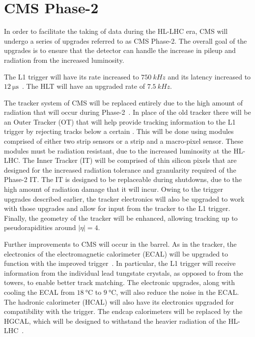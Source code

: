\section{CMS Phase-2}
\label{section:phase2}
In order to facilitate the taking of data during the HL-LHC era, CMS will undergo a series of upgrades referred to as CMS Phase-2. The overall goal of the upgrades is to ensure that the detector can handle the increase in pileup and radiation from the increased luminosity.

The L1 trigger will have its rate increased to $\SI{750}{kHz}$ and its latency increased to $\SI{12}{\us}$~\cite{CERN-LHCC-2020-004}. The HLT will have an upgraded rate of $\SI{7.5}{kHz}$.

The tracker system of CMS will be replaced entirely due to the high amount of radiation that will occur during Phase-2~\cite{CERN-LHCC-2017-009}. In place of the old tracker there will be an Outer Tracker (OT) that will help provide tracking information to the L1 trigger by rejecting tracks below a certain \pt. This will be done using \pt modules comprised of either two strip sensors or a strip and a macro-pixel sensor. These modules must be radiation resistant, due to the increased luminosity at the HL-LHC. The Inner Tracker (IT) will be comprised of thin silicon pixels that are designed for the increased radiation tolerance and granularity required of the Phase-2 IT. The IT is designed to be replaceable during shutdowns, due to the high amount of radiation damage that it will incur. Owing to the trigger upgrades described earlier, the tracker electronics will also be upgraded to work with those upgrades and allow for input from the tracker to the L1 trigger. Finally, the geometry of the tracker will be enhanced, allowing tracking up to pseudorapidities around $|\eta| = 4$.

Further improvements to CMS will occur in the barrel. As in the tracker, the electronics of the electromagnetic calorimeter (ECAL) will be upgraded to function with the improved trigger~\cite{CERN-LHCC-2017-011}. In particular, the L1 trigger will receive information from the individual lead tungstate crystals, as opposed to from the towers, to enable better track matching. The electronic upgrades, along with cooling the ECAL from $\SI{18}{\degreeCelsius}$ to $\SI{9}{\degreeCelsius}$, will also reduce the noise in the ECAL. The hadronic calorimeter (HCAL) will also have its electronics upgraded for compatibility with the trigger. The endcap calorimeters will be replaced by the HGCAL, which will be designed to withstand the heavier radiation of the HL-LHC~\cite{CERN-LHCC-2017-023}. 

